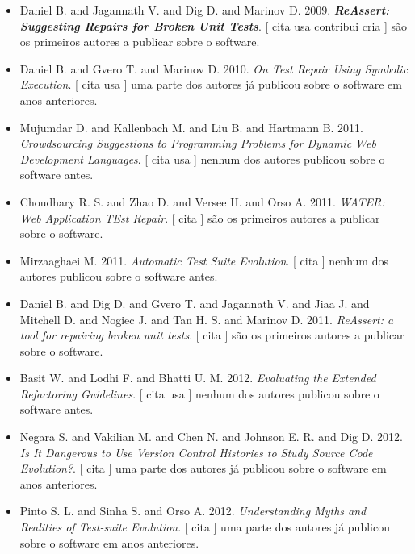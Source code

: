 \begin{itemize}
\item Daniel B. and Jagannath V. and Dig D. and Marinov D.
      2009.
        \textbf{\textit{ ReAssert: Suggesting Repairs for Broken Unit Tests}}.
      [
          cita
          usa
          contribui
          cria
      ]
são os primeiros autores a publicar sobre o software.
\item Daniel B. and Gvero T. and Marinov D.
      2010.
        \textit{ On Test Repair Using Symbolic Execution}.
      [
          cita
          usa
      ]
uma parte dos autores já publicou sobre o software em anos anteriores.
\item Mujumdar D. and Kallenbach M. and Liu B. and Hartmann B.
      2011.
        \textit{ Crowdsourcing Suggestions to Programming Problems for Dynamic Web Development Languages}.
      [
          cita
          usa
      ]
nenhum dos autores publicou sobre o software antes.
\item Choudhary R. S. and Zhao D. and Versee H. and Orso A.
      2011.
        \textit{ WATER: Web Application TEst Repair}.
      [
          cita
      ]
são os primeiros autores a publicar sobre o software.
\item Mirzaaghaei M.
      2011.
        \textit{ Automatic Test Suite Evolution}.
      [
          cita
      ]
nenhum dos autores publicou sobre o software antes.
\item Daniel B. and Dig D. and Gvero T. and Jagannath V. and Jiaa J. and Mitchell D. and Nogiec J. and Tan H. S. and Marinov D.
      2011.
        \textit{ ReAssert: a tool for repairing broken unit tests}.
      [
          cita
      ]
são os primeiros autores a publicar sobre o software.
\item Basit W. and Lodhi F. and Bhatti U. M.
      2012.
        \textit{ Evaluating the Extended Refactoring Guidelines}.
      [
          cita
          usa
      ]
nenhum dos autores publicou sobre o software antes.
\item Negara S. and Vakilian M. and Chen N. and Johnson E. R. and Dig D.
      2012.
        \textit{ Is It Dangerous to Use Version Control Histories to Study Source Code Evolution?}.
      [
          cita
      ]
uma parte dos autores já publicou sobre o software em anos anteriores.
\item Pinto S. L. and Sinha S. and Orso A.
      2012.
        \textit{ Understanding Myths and Realities of Test-suite Evolution}.
      [
          cita
      ]
uma parte dos autores já publicou sobre o software em anos anteriores.

\end{itemize}
